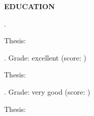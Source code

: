 %
%
%
%
%



\vspace{\spaceSection}
\begin{center}
    \textbf{EDUCATION}
\end{center}
\vspace{\spaceSection}

\textbf{\PhDUniversity} \hfill \PhDLocation

\PhDFaculty \hfill \PhDDate

\textbf{\PhDTitle}.

Thesis: \PhDThesis 

\PhDGrant

\vspace{\spaceSection}

\textbf{\MScUniversity} \hfill \MScLocation

\MScFaculty \hfill	\MScDate

\textbf{\MScTitle}. Grade: excellent (score: \MScScore)

Thesis: \MScThesis

\MScNotes

\vspace{\spaceSection}

\textbf{\BScUniversity} \hfill \BScLocation

\BScFaculty \hfill \BScDate

\textbf{\BScTitle}. Grade: very good (score: \BScScore)

Thesis: \BScThesis